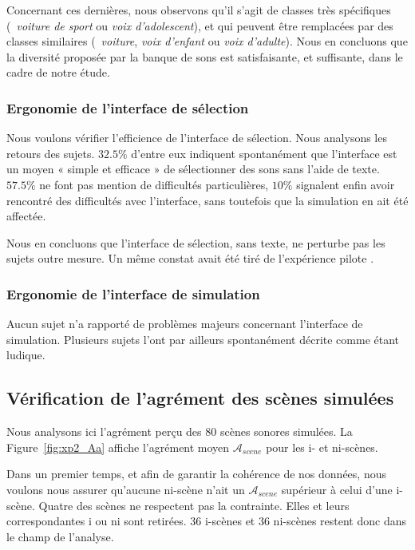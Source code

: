 Concernant ces dernières, nous observons qu'il s'agit de classes très spécifiques (\eg~\emph{voiture de sport} ou \emph{voix d'adolescent}), et qui peuvent être remplacées par des classes similaires (\eg~\emph{voiture}, \emph{voix d'enfant} ou \emph{voix d'adulte}). Nous en concluons que la diversité proposée par la banque de sons est satisfaisante, et suffisante, dans le cadre de notre étude.

\subsubsection{Ergonomie de l'interface de sélection}

Nous voulons vérifier l'efficience de l'interface de sélection. Nous analysons les retours des sujets. $32.5\%$ d'entre eux indiquent spontanément que l'interface est un moyen « simple et efficace » de sélectionner des sons sans l'aide de texte. $57.5\%$ ne font pas mention de difficultés particulières, $10\%$ signalent enfin avoir rencontré des difficultés avec l'interface, sans toutefois que la simulation en ait été affectée.

Nous en concluons que l'interface de sélection, sans texte, ne perturbe pas les sujets outre mesure. Un même constat avait été tiré de l'expérience pilote \citep{lafay2013atiam,lafay2014new}. 

\subsubsection{Ergonomie de l'interface de simulation}

Aucun sujet n'a rapporté de problèmes majeurs concernant l'interface de simulation. Plusieurs sujets l'ont par ailleurs spontanément décrite comme étant ludique.

\subsection{Vérification de l'agrément des scènes simulées}

Nous analysons ici l'agrément perçu des $80$ scènes sonores simulées. La Figure~\ref{fig:xp2_Aa} affiche l'agrément moyen $\mathcal{A}_{scene}$ pour les i- et ni-scènes. 

Dans un premier temps, et afin de garantir la cohérence de nos données, nous voulons nous assurer qu'aucune ni-scène n'ait un $\mathcal{A}_{scene}$ supérieur à celui d'une i-scène. Quatre des scènes ne respectent pas la contrainte. Elles et leurs correspondantes i ou ni sont retirées. 36 i-scènes et 36 ni-scènes restent donc dans le champ de l'analyse.

